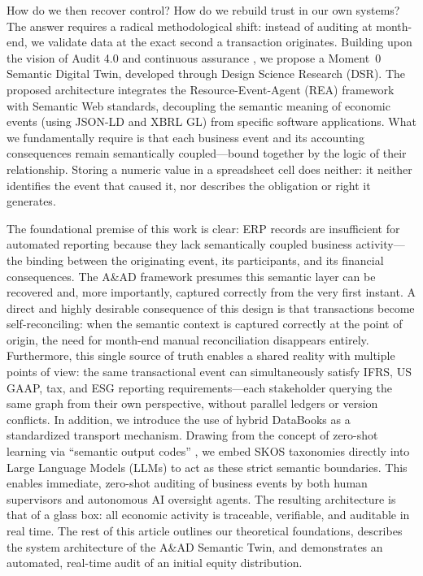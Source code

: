 \documentclass[12pt, a4paper]{article}
\begin{document}
How do we then recover control? How do we rebuild trust in our own systems? The answer requires a radical methodological shift: instead of auditing at month-end, we validate data at the exact second a transaction originates. Building upon the vision of Audit 4.0 and continuous assurance \cite{dai2016}, we propose a Moment~0 Semantic Digital Twin, developed through Design Science Research (DSR). The proposed architecture integrates the Resource-Event-Agent (REA) framework with Semantic Web standards, decoupling the semantic meaning of economic events (using JSON-LD and XBRL GL) from specific software applications. What we fundamentally require is that each business event and its accounting consequences remain semantically coupled---bound together by the logic of their relationship. Storing a numeric value in a spreadsheet cell does neither: it neither identifies the event that caused it, nor describes the obligation or right it generates.

The foundational premise of this work is clear: ERP records are insufficient for automated reporting because they lack semantically coupled business activity---the binding between the originating event, its participants, and its financial consequences. The A\&AD framework presumes this semantic layer can be recovered and, more importantly, captured correctly from the very first instant. A direct and highly desirable consequence of this design is that transactions become self-reconciling: when the semantic context is captured correctly at the point of origin, the need for month-end manual reconciliation disappears entirely. Furthermore, this single source of truth enables a shared reality with multiple points of view: the same transactional event can simultaneously satisfy IFRS, US GAAP, tax, and ESG reporting requirements---each stakeholder querying the same graph from their own perspective, without parallel ledgers or version conflicts. In addition, we introduce the use of hybrid DataBooks \cite{cagle2026} as a standardized transport mechanism. Drawing from the concept of zero-shot learning via ``semantic output codes'' \cite{palatucci2009}, we embed SKOS taxonomies \cite{w3cskos} directly into Large Language Models (LLMs) to act as these strict semantic boundaries. This enables immediate, zero-shot auditing of business events by both human supervisors and autonomous AI oversight agents. The resulting architecture is that of a glass box: all economic activity is traceable, verifiable, and auditable in real time. The rest of this article outlines our theoretical foundations, describes the system architecture of the A\&AD Semantic Twin, and demonstrates an automated, real-time audit of an initial equity distribution.
\end{document}
